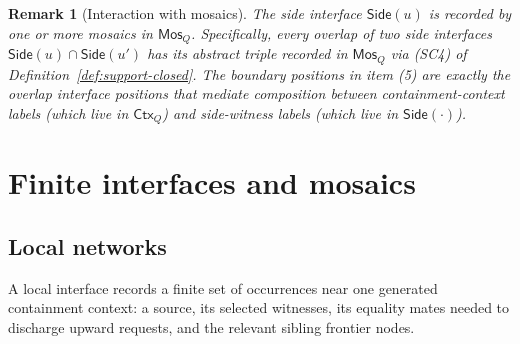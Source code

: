 \documentclass[11pt]{article}
\newtheorem{remark}[theorem]{Remark}
\newcommand{\Mos}{\mathsf{Mos}}
\newcommand{\Ctx}{\mathsf{Ctx}}
\newcommand{\Side}{\mathsf{Side}}
\begin{document}
\begin{remark}[Interaction with mosaics]
The side interface $\Side(u)$ is recorded by one or more mosaics
in $\Mos_Q$.  Specifically, every overlap of two side interfaces
$\Side(u)\cap\Side(u')$ has its abstract triple recorded in
$\Mos_Q$ via (SC4) of Definition~\ref{def:support-closed}.  The
boundary positions in item (5) are exactly the overlap interface
positions that mediate composition between containment-context
labels (which live in $\Ctx_Q$) and side-witness labels (which live
in $\Side(\cdot)$).
\end{remark}

\section{Finite interfaces and mosaics}

\subsection{Local networks}

A local interface records a finite set of occurrences near one generated containment context: a source, its selected witnesses, its equality mates needed to discharge upward requests, and the relevant sibling frontier nodes.
\end{document}
